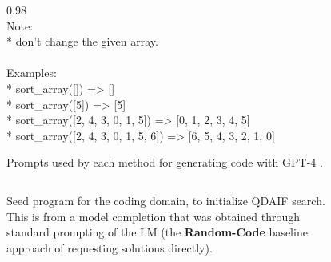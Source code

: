 \begin{figure}[ht]
\begin{boxedminipage}{0.98\textwidth}
\\
Note:\\
* don't change the given array.\\
\\
Examples:\\
* sort\_array([]) =\textgreater{} []\\
* sort\_array([5]) =\textgreater{} [5]\\
* sort\_array([2, 4, 3, 0, 1, 5]) =\textgreater{} [0, 1, 2, 3, 4, 5]\\
* sort\_array([2, 4, 3, 0, 1, 5, 6]) =\textgreater{} [6, 5, 4, 3, 2, 1, 0]\\
\end{boxedminipage}
\caption{Prompts used by each method for generating code with GPT-4 \citep{openai2023gpt4}.}
\label{app:fig:code_baseline_prompts}
\end{figure}

\begin{figure}[ht]
\inputminted[mathescape,
               linenos,
               numbersep=5pt,
               gobble=0,
               frame=lines,
               framesep=2mm]{python}{main_figures/extensions/seed_code.py}
\caption{Seed program for the coding domain, to initialize QDAIF search. This is from a model completion that was obtained through standard prompting of the LM (the \textbf{Random-Code} baseline approach of requesting solutions directly).}
\label{app:fig:code_seed}
\end{figure}

